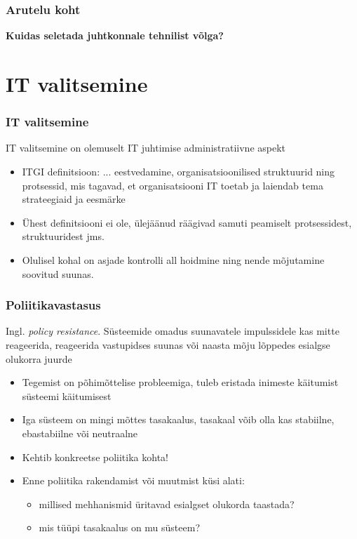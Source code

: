\begin{frame}[fragile]
  \frametitle{Arutelu koht}
		\begin{center}
			\textbf{Kuidas seletada juhtkonnale tehnilist võlga?}
		\end{center}
\end{frame}

\section{IT valitsemine}

\begin{frame}[fragile]
  \frametitle{IT valitsemine}
  IT valitsemine on olemuselt IT juhtimise administratiivne aspekt
	\begin{itemize}
		\item ITGI definitsioon: ... eestvedamine, organisatsioonilised struktuurid ning protsessid, mis tagavad, et organisatsiooni IT toetab ja laiendab tema strateegiaid ja eesmärke \citep{insitute2003board}
		\item Ühest definitsiooni ei ole, ülejäänud räägivad samuti peamiselt protsessidest, struktuuridest jms. 
		\item Olulisel kohal on asjade kontrolli all hoidmine ning nende mõjutamine soovitud suunas. 
	\end{itemize}
\end{frame}

\begin{frame}[fragile]
  \frametitle{Poliitikavastasus}
 Ingl. \emph{policy resistance}. Süsteemide omadus suunavatele impulssidele kas mitte reageerida, reageerida vastupidses suunas või naasta mõju lõppedes esialgse olukorra juurde
	\begin{itemize}
		\item Tegemist on põhimõttelise probleemiga, tuleb eristada inimeste käitumist süsteemi käitumisest
		\item Iga süsteem on mingi mõttes tasakaalus, tasakaal võib olla kas stabiilne, ebastabiilne või neutraalne
		\item Kehtib konkreetse poliitika kohta!
		\item Enne poliitika rakendamist või muutmist küsi alati: 
		\begin{itemize}
			\item millised mehhanismid üritavad esialgset olukorda taastada? 
			\item mis tüüpi tasakaalus on mu süsteem?
	\end{itemize}

	\end{itemize}
\end{frame}

